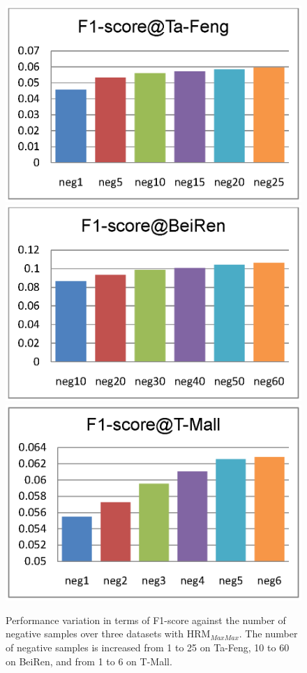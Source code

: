\documentclass[10pt,journal,compsoc]{IEEEtran}
\begin{document}
\begin{figure}[t]
\centering
\includegraphics[scale=0.35,viewport=50 550 400 800,clip=true]{negtafeng.eps}
\includegraphics[scale=0.35,viewport=50 550 400 800,clip=true]{negbeiren.eps}
\includegraphics[scale=0.35,viewport=50 550 400 800,clip=true]{negtaobao.eps}
\caption{\label{fig:neg}Performance variation in terms of F1-score against the number of negative samples over three datasets with HRM$_{MaxMax}$. The number of negative samples is increased from 1 to 25 on Ta-Feng, 10 to 60 on BeiRen, and from 1 to 6 on T-Mall.}
\end{figure}
\end{document}

